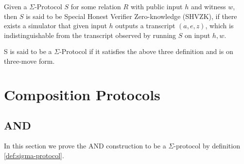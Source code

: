 \begin{definition}
Given a $\Sigma$-Protocol $S$ for some relation $R$ with public input $h$ and
witness $w$, then $S$ is said to be Special Honest Verifier Zero-knowledge
(SHVZK), if there exists a simulator that given input $h$ outputs a
transcript $(a,e,z)$, which is indistinguishable from the transcript observed by
running $S$ on input $h, w$.


\end{definition}

\begin{definition}
\label{def:sigma-protocol}
  S is said to be a $\Sigma$-Protocol if it satisfies the above three definition
  and is on three-move form.
\end{definition}



\section{Composition Protocols}
\label{sec:sigma_comp}

\subsection{AND}
\label{subsec:sigma_AND}

In this section we prove the AND construction to be a $\Sigma$-protocol by
definition \ref{def:sigma-protocol}.


